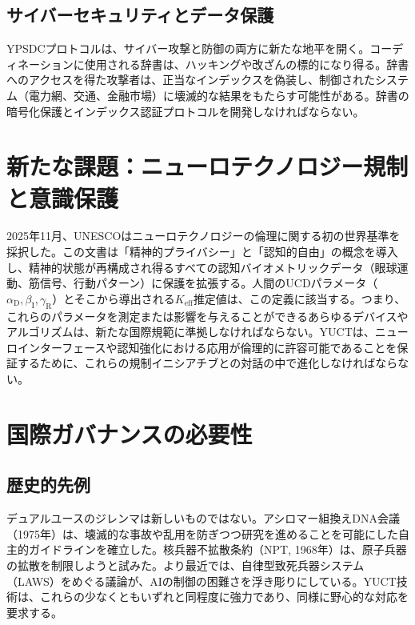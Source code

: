 \documentclass[12pt,a4paper]{article}
\theoremstyle{remark}
\newcommand{\Keff}{K_{\mathrm{eff}}}
\newcommand{\alD}{\alpha_{\mathrm{D}}}
\newcommand{\beI}{\beta_{\mathrm{I}}}
\newcommand{\gaR}{\gamma_{\mathrm{R}}}
\begin{document}
	\subsection{サイバーセキュリティとデータ保護}
	\label{subsec:cyber}
	
	YPSDCプロトコルは、サイバー攻撃と防御の両方に新たな地平を開く。コーディネーションに使用される辞書は、ハッキングや改ざんの標的になり得る。辞書へのアクセスを得た攻撃者は、正当なインデックスを偽装し、制御されたシステム（電力網、交通、金融市場）に壊滅的な結果をもたらす可能性がある。辞書の暗号化保護とインデックス認証プロトコルを開発しなければならない。
	
	\section{新たな課題：ニューロテクノロジー規制と意識保護}
	\label{sec:neuroethics}
	
	2025年11月、UNESCOはニューロテクノロジーの倫理に関する初の世界基準を採択した。この文書は「精神的プライバシー」と「認知的自由」の概念を導入し、精神的状態が再構成され得るすべての認知バイオメトリックデータ（眼球運動、筋信号、行動パターン）に保護を拡張する。人間のUCDパラメータ（\(\alD,\beI,\gaR\)）とそこから導出される\(\Keff\)推定値は、この定義に該当する。つまり、これらのパラメータを測定または影響を与えることができるあらゆるデバイスやアルゴリズムは、新たな国際規範に準拠しなければならない。YUCTは、ニューロインターフェースや認知強化における応用が倫理的に許容可能であることを保証するために、これらの規制イニシアチブとの対話の中で進化しなければならない。
	
	\section{国際ガバナンスの必要性}
	\label{sec:governance}
	
	\subsection{歴史的先例}
	\label{subsec:precedents}
	
	デュアルユースのジレンマは新しいものではない。アシロマー組換えDNA会議（1975年）は、壊滅的な事故や乱用を防ぎつつ研究を進めることを可能にした自主的ガイドラインを確立した。核兵器不拡散条約（NPT, 1968年）は、原子兵器の拡散を制限しようと試みた。より最近では、自律型致死兵器システム（LAWS）をめぐる議論が、AIの制御の困難さを浮き彫りにしている。YUCT技術は、これらの少なくともいずれと同程度に強力であり、同様に野心的な対応を要求する。
	
\end{document}
